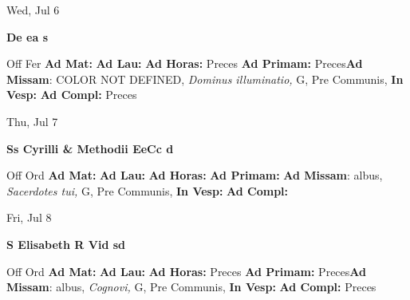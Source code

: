 \documentclass[10pt]{book}
\begin{document}
\begin{center}
\begin{minipage}{3.5in}
\vspace{2em}
\begin{center}Wed, Jul 6
\end{center}
\textbf{ \large De ea
\textnormal{\normalsize s}}

\begin{justify}Off Fer
\textbf{Ad Mat: }
\textbf{Ad Lau: }
\textbf{Ad Horas: }Preces
\textbf{Ad Primam: }Preces\textbf{Ad Missam}: COLOR NOT DEFINED, \textit{Dominus illuminatio,} G, Pre Communis, 
\textbf{In Vesp: }
\textbf{Ad Compl: }Preces
\end{justify}
\end{minipage}
\end{center}

\begin{center}
\begin{minipage}{3.5in}
\vspace{2em}
\begin{center}Thu, Jul 7
\end{center}
\textbf{ \large Ss Cyrilli \& Methodii EeCc
\textnormal{\normalsize d}}

\begin{justify}Off Ord
\textbf{Ad Mat: }
\textbf{Ad Lau: }
\textbf{Ad Horas: }
\textbf{Ad Primam: }\textbf{Ad Missam}: albus, \textit{Sacerdotes tui,} G, Pre Communis, 
\textbf{In Vesp: }
\textbf{Ad Compl: }
\end{justify}
\end{minipage}
\end{center}

\begin{center}
\begin{minipage}{3.5in}
\vspace{2em}
\begin{center}Fri, Jul 8
\end{center}
\textbf{ \large S Elisabeth R Vid
\textnormal{\normalsize sd}}

\begin{justify}Off Ord
\textbf{Ad Mat: }
\textbf{Ad Lau: }
\textbf{Ad Horas: }Preces
\textbf{Ad Primam: }Preces\textbf{Ad Missam}: albus, \textit{Cognovi,} G, Pre Communis, 
\textbf{In Vesp: }
\textbf{Ad Compl: }Preces
\end{justify}
\end{minipage}
\end{center}
\end{document}
